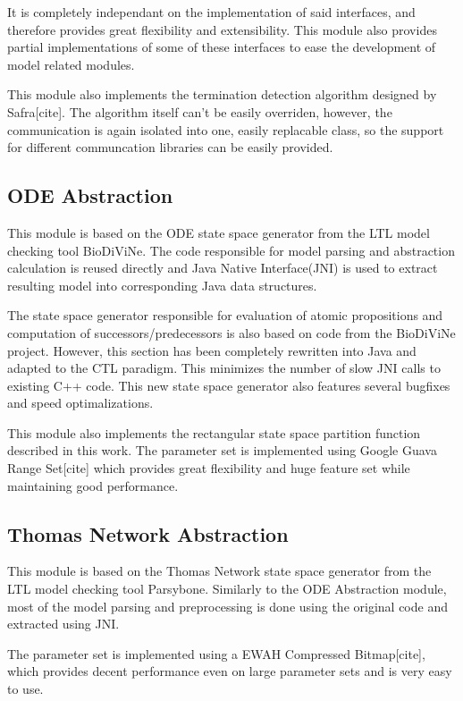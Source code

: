 \documentclass[12pt,oneside,draft]{fithesis2}
\begin{document}
				It is completely independant on the implementation of said interfaces, and therefore provides great flexibility and extensibility. This module also provides partial implementations of some of these interfaces to ease the development of model related modules. 
				
				This module also implements the termination detection algorithm designed by Safra[cite]. The algorithm itself can't be easily overriden, however, the communication is again isolated into one, easily replacable class, so the support for different communcation libraries can be easily provided.
	
			\subsection{ODE Abstraction}
			
				This module is based on the ODE state space generator from the LTL model checking tool BioDiViNe. The code responsible for model parsing and abstraction calculation is reused directly and Java Native Interface(JNI) is used to extract resulting model into corresponding Java data structures.
				
				The state space generator responsible for evaluation of atomic propositions and computation of successors/predecessors is also based on code from the BioDiViNe project. However, this section has been completely rewritten into Java and adapted to the CTL paradigm. This minimizes the number of slow JNI calls to existing C++ code. This new state space generator also features several bugfixes and speed optimalizations.
				
				This module also implements the rectangular state space partition function described in this work. The parameter set is implemented using Google Guava Range Set[cite] which provides great flexibility and huge feature set while maintaining good performance.
				
			\subsection{Thomas Network Abstraction}

				This module is based on the Thomas Network state space generator from the LTL model checking tool Parsybone. Similarly to the ODE Abstraction module, most of the model parsing and preprocessing is done using the original code and extracted using JNI. 
				
				The parameter set is implemented using a EWAH Compressed Bitmap[cite], which provides decent performance even on large parameter sets and is very easy to use. 
				
\end{document}

